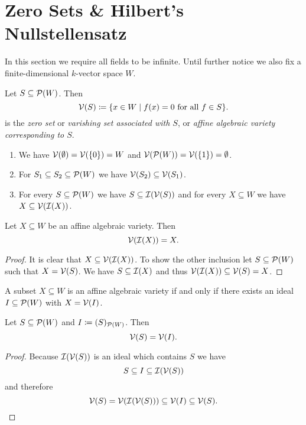 \section{Zero Sets \& Hilbert’s Nullstellensatz}
In this section we require all fields to be infinite. Until further notice we also fix a finite-dimensional $k$-vector space $W$.


\begin{defi}
 Let $S \subseteq \mathcal{P}(W)$. Then
 \[
  \mathcal{V}(S) \coloneqq \{x \in W \mid f(x) = 0 \text{ for all } f \in S\}.
 \]
 is the \emph{zero set} or \emph{varishing set associated with $S$}, or \emph{affine algebraic variety corresponding to $S$}.
\end{defi}


\begin{expls}
 \begin{enumerate}[label=\emph{\alph*)},leftmargin=*]
  \item
   We have $\mathcal{V}(\emptyset) = \mathcal{V}(\{0\}) = W$ and $\mathcal{V}(\mathcal{P}(W)) = \mathcal{V}(\{1\}) = \emptyset$.
  \item
   For $S_1 \subseteq S_2 \subseteq \mathcal{P}(W)$ we have $\mathcal{V}(S_2) \subseteq \mathcal{V}(S_1)$.
  \item
   For every $S \subseteq \mathcal{P}(W)$ we have $S \subseteq \mathcal{I}(\mathcal{V}(S))$ and for every $X \subseteq W$ we have $X \subseteq \mathcal{V}(\mathcal{I}(X))$.
 \end{enumerate}
\end{expls}


\begin{lem}
 Let $X \subseteq W$ be an affine algebraic variety. Then
 \[
  \mathcal{V}(\mathcal{I}(X)) = X.
 \]
\end{lem}
\begin{proof}
 It is clear that $X \subseteq \mathcal{V}(\mathcal{I}(X))$. To show the other inclusion let $S \subseteq \mathcal{P}(W)$ such that $X = \mathcal{V}(S)$. We have $S \subseteq \mathcal{I}(X)$ and thus $\mathcal{V}(\mathcal{I}(X)) \subseteq \mathcal{V}(S) = X$.
\end{proof}


\begin{cor}
 A subset $X \subseteq W$ is an affine algebraic variety if and only if there exists an ideal $I \subseteq \mathcal{P}(W)$ with $X = \mathcal{V}(I)$.
\end{cor}



\begin{cor}
 Let $S \subseteq \mathcal{P}(W)$ and $I \coloneqq (S)_{\mathcal{P}(W)}$. Then
 \[
  \mathcal{V}(S) = \mathcal{V}(I).
 \]
\end{cor}
\begin{proof}
 Because $\mathcal{I}(\mathcal{V}(S))$ is an ideal which contains $S$ we have
 \[
  S \subseteq I \subseteq \mathcal{I}(\mathcal{V}(S))
 \]
 and therefore
 \[
  \mathcal{V}(S) = \mathcal{V}(\mathcal{I}(\mathcal{V}(S))) \subseteq \mathcal{V}(I) \subseteq \mathcal{V}(S).
  \qedhere
 \]
\end{proof}



